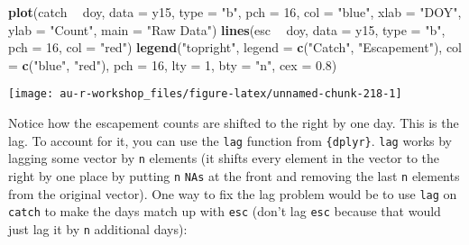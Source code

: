\documentclass[]{book}
\newenvironment{Shaded}{\begin{snugshade}}{\end{snugshade}}
\newcommand{\KeywordTok}[1]{\textcolor[rgb]{0.13,0.29,0.53}{\textbf{#1}}}
\newcommand{\DataTypeTok}[1]{\textcolor[rgb]{0.13,0.29,0.53}{#1}}
\newcommand{\DecValTok}[1]{\textcolor[rgb]{0.00,0.00,0.81}{#1}}
\newcommand{\FloatTok}[1]{\textcolor[rgb]{0.00,0.00,0.81}{#1}}
\newcommand{\StringTok}[1]{\textcolor[rgb]{0.31,0.60,0.02}{#1}}
\newcommand{\OperatorTok}[1]{\textcolor[rgb]{0.81,0.36,0.00}{\textbf{#1}}}
\newcommand{\NormalTok}[1]{#1}
\theoremstyle{definition}
\theoremstyle{definition}
\theoremstyle{definition}
\theoremstyle{remark}
\begin{document}
\begin{Shaded}
\begin{Highlighting}[]
\KeywordTok{plot}\NormalTok{(catch }\OperatorTok{~}\StringTok{ }\NormalTok{doy, }\DataTypeTok{data =}\NormalTok{ y15, }\DataTypeTok{type =} \StringTok{"b"}\NormalTok{, }\DataTypeTok{pch =} \DecValTok{16}\NormalTok{, }\DataTypeTok{col =} \StringTok{"blue"}\NormalTok{,}
     \DataTypeTok{xlab =} \StringTok{"DOY"}\NormalTok{, }\DataTypeTok{ylab =} \StringTok{"Count"}\NormalTok{, }\DataTypeTok{main =} \StringTok{"Raw Data"}\NormalTok{)}
\KeywordTok{lines}\NormalTok{(esc }\OperatorTok{~}\StringTok{ }\NormalTok{doy, }\DataTypeTok{data =}\NormalTok{ y15, }\DataTypeTok{type =} \StringTok{"b"}\NormalTok{, }\DataTypeTok{pch =} \DecValTok{16}\NormalTok{, }\DataTypeTok{col =} \StringTok{"red"}\NormalTok{)}
\KeywordTok{legend}\NormalTok{(}\StringTok{"topright"}\NormalTok{, }\DataTypeTok{legend =} \KeywordTok{c}\NormalTok{(}\StringTok{"Catch"}\NormalTok{, }\StringTok{"Escapement"}\NormalTok{), }
       \DataTypeTok{col =} \KeywordTok{c}\NormalTok{(}\StringTok{"blue"}\NormalTok{, }\StringTok{"red"}\NormalTok{), }\DataTypeTok{pch =} \DecValTok{16}\NormalTok{, }\DataTypeTok{lty =} \DecValTok{1}\NormalTok{, }\DataTypeTok{bty =} \StringTok{"n"}\NormalTok{, }\DataTypeTok{cex =} \FloatTok{0.8}\NormalTok{)}
\end{Highlighting}
\end{Shaded}

\begin{center}\texttt{[image: au-r-workshop\_files/figure-latex/unnamed-chunk-218-1]} \end{center}

Notice how the escapement counts are shifted to the right by one day.
This is the lag. To account for it, you can use the \texttt{lag}
function from \texttt{\{dplyr\}}. \texttt{lag} works by lagging some
vector by \texttt{n} elements (it shifts every element in the vector to
the right by one place by putting \texttt{n} \texttt{NAs} at the front
and removing the last \texttt{n} elements from the original vector). One
way to fix the lag problem would be to use \texttt{lag} on
\texttt{catch} to make the days match up with \texttt{esc} (don't lag
\texttt{esc} because that would just lag it by \texttt{n} additional
days):
\end{document}
